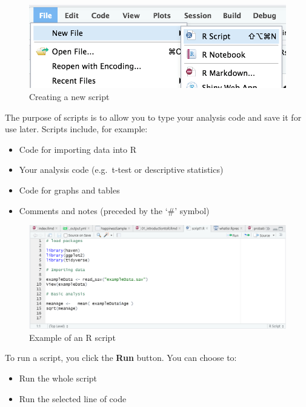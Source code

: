 \documentclass[
]{book}
\providecommand{\tightlist}{%
  \setlength{\itemsep}{0pt}\setlength{\parskip}{0pt}}
\begin{document}
\begin{figure}
\centering
\includegraphics{images/file.png}
\caption{Creating a new script}
\end{figure}

The purpose of scripts is to allow you to type your analysis code and save it for use later. Scripts include, for example:

\begin{itemize}
\tightlist
\item
  Code for importing data into R
\item
  Your analysis code (e.g.~t-test or descriptive statistics)
\item
  Code for graphs and tables
\item
  Comments and notes (preceded by the `\#' symbol)
\end{itemize}

\begin{figure}
\centering
\includegraphics{images/script.png}
\caption{Example of an R script}
\end{figure}

To run a script, you click the \textbf{Run} button. You can choose to:

\begin{itemize}
\tightlist
\item
  Run the whole script
\item
  Run the selected line of code
\end{itemize}
\end{document}
